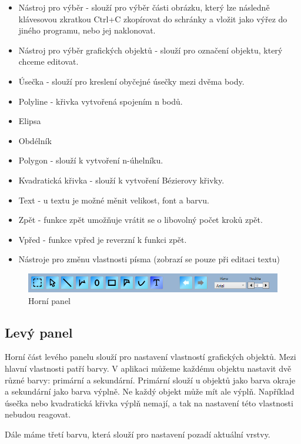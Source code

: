 \documentclass[
  field=inf,
  biblatex=false,
  glossaries,
  index
]{kidiplom}
\begin{document}
\begin{itemize}
\item Nástroj pro výběr - slouží pro výběr části obrázku, který lze následně klávesovou zkratkou Ctrl+C zkopírovat do schránky a vložit jako výřez do jiného programu, nebo jej naklonovat.
\item Nástroj pro výběr grafických objektů - slouží pro označení objektu, který chceme editovat.
\item Úsečka - slouží pro kreslení obyčejné úsečky mezi dvěma body.
\item Polyline - křivka vytvořená spojením n bodů.
\item Elipsa
\item Obdélník
\item Polygon - slouží k vytvoření n-úhelníku.
\item Kvadratická křivka - slouží k vytvoření Bézierovy křivky.
\item Text - u textu je možné měnit velikost, font a barvu.
\item Zpět - funkce zpět umožňuje vrátit se o libovolný počet kroků zpět.
\item Vpřed - funkce vpřed je reverzní k funkci zpět.
\item Nástroje pro změnu vlastnosti písma (zobrazí se pouze při editaci textu)
\end{itemize}

\begin{figure}
\includegraphics[width=16cm]{img/toppanel}
\caption{Horní panel}
\end{figure}


\subsection{Levý panel}

Horní část levého panelu slouží pro nastavení vlastností grafických objektů. Mezi hlavní vlastnosti patří barvy. V aplikaci můžeme každému objektu nastavit dvě různé barvy: primární a sekundární. Primární slouží u objektů jako barva okraje a sekundární jako barva výplně. Ne každý objekt může mít ale výplň. Například úsečka nebo kvadratická křivka výplň nemají, a tak na nastavení této vlastnosti nebudou reagovat. 

Dále máme třetí barvu, která slouží pro nastavení pozadí aktuální vrstvy.
\end{document}
